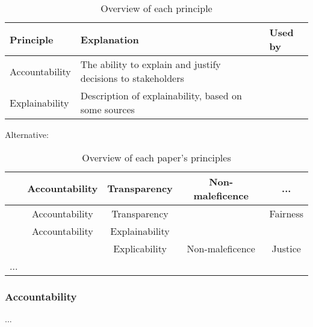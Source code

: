 

\begin{table}[htp]
    \centering
    \begin{tabular}{lp{}p{}}
        \textbf{Principle} & \textbf{Explanation} & \textbf{Used by} \\
        \midrule
        Accountability & The ability to explain and justify decisions to stakeholders & \textcite{Dignum_2021,Cheng_2021,Mikalef_2022,Anagnostou_2022} \\
        Explainability & Description of explainability, based on some sources & \textcite{BarredoArrieta_2020} \\
        \bottomrule
    \end{tabular}
    \caption{Overview of each principle}
    \label{tab:my_label}
\end{table}

Alternative:
\begin{table}[htp]
    \centering
    \begin{tabular}{ccccc}
        & Accountability & Transparency & Non-maleficence & ... \\
     \midrule
        \textcite{Anagnostou_2022} & Accountability & Transparency & & Fairness \\
        \textcite{BarredoArrieta_2020} & Accountability & Explainability & & \\
        \textcite{Borda_2022} & &  Explicability & Non-maleficence & Justice \\
        ...
    \end{tabular}
    \caption{Overview of each paper's principles}
    \label{tab:my_label}
\end{table}

\subsubsection{Accountability}
...

